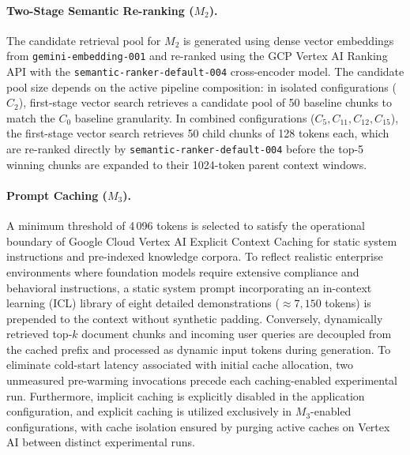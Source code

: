 \paragraph{Two-Stage Semantic Re-ranking ($M_2$).}
The candidate retrieval pool for $M_2$ is generated using dense vector embeddings from \texttt{gemini-embedding-001} and re-ranked using the GCP Vertex AI Ranking API with the \texttt{semantic-\allowbreak{}ranker-\allowbreak{}default-\allowbreak{}004} cross-encoder model. The candidate pool size depends on the active pipeline composition: in isolated configurations ($C_2$), first-stage vector search retrieves a candidate pool of 50 baseline chunks to match the $C_0$ baseline granularity. In combined configurations ($C_5, C_{11}, C_{12}, C_{15}$), the first-stage vector search retrieves 50 child chunks of 128 tokens each, which are re-ranked directly by \texttt{semantic-\allowbreak{}ranker-\allowbreak{}default-\allowbreak{}004} before the top-5 winning chunks are expanded to their 1024-token parent context windows.

\paragraph{Prompt Caching ($M_3$).}
A minimum threshold of 4\,096 tokens is selected to satisfy the operational boundary of Google Cloud Vertex AI Explicit Context Caching for static system instructions and pre-indexed knowledge corpora. To reflect realistic enterprise environments where foundation models require extensive compliance and behavioral instructions, a static system prompt incorporating an in-context learning (ICL) library of eight detailed demonstrations ($\approx 7{,}150$ tokens) is prepended to the context without synthetic padding. Conversely, dynamically retrieved top-$k$ document chunks and incoming user queries are decoupled from the cached prefix and processed as dynamic input tokens during generation. To eliminate cold-start latency associated with initial cache allocation, two unmeasured pre-warming invocations precede each caching-enabled experimental run. Furthermore, implicit caching is explicitly disabled in the application configuration, and explicit caching is utilized exclusively in $M_3$-enabled configurations, with cache isolation ensured by purging active caches on Vertex AI between distinct experimental runs.

